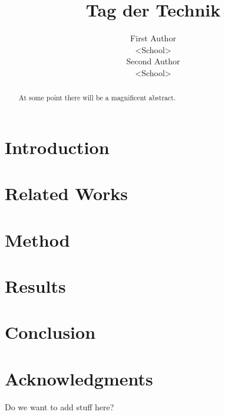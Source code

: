 \documentclass[11pt]{article}
\title{Tag der Technik}
\author{First Author\\
  <School> \\\And
  Second Author \\
  <School> \\
}
\begin{document}
\maketitle
\begin{abstract}
At some point there will be a magnificent abstract.
\end{abstract}

\section{Introduction}

\section{Related Works}
\cite{vaswani17}

\section{Method}

\section{Results}

\section{Conclusion}

\section*{Acknowledgments}
Do we want to add stuff here?


\end{document}
